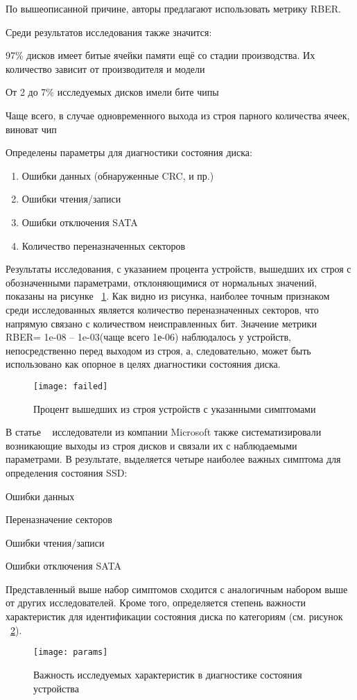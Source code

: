 По вышеописанной причине, авторы предлагают использовать метрику RBER. 


Среди результатов исследования также значится:
\begin{itemize*}
	\item{97\% дисков имеет битые ячейки памяти ещё со стадии производства. Их количество зависит от производителя и модели} 
    \item{От 2 до 7\% исследуемых дисков имели бите чипы}
    \item{Чаще всего, в случае одновременного выхода из строя парного количества ячеек, виноват чип} 
    \item{Определены параметры для диагностики состояния диска:}
	\begin{enumerate}
		\item{Ошибки данных (обнаруженные CRC, и пр.)}
		\item{Ошибки чтения/записи}
		\item{Ошибки отключения SATA}
		\item{Количество переназначенных секторов}
	\end{enumerate}
\end{itemize*}

Результаты исследования, с указанием процента устройств, вышедших их строя с обозначенными параметрами, отклоняющимися от нормальных значений, показаны на рисунке ~\ref{fig:failed}. Как видно из рисунка, наиболее точным признаком среди исследованных является количество переназначенных секторов, что напрямую связано с количеством неисправленных бит.
Значение метрики RBER= 1e-08 – 1e-03(чаще всего 1е-06) наблюдалось у устройств, непосредственно перед выходом из строя, а, следовательно, может быть использовано как опорное в целях диагностики состояния диска.

\begin{figure}[h]
	\centering
	\texttt{[image: failed]}
	\caption{Процент вышедших из строя устройств 
с указанными симптомами}
	\label{fig:failed}
\end{figure}

В статье ~\cite{faildatacenter} исследователи из компании Microsoft также систематизировали возникающие выходы из строя дисков и связали их с наблюдаемыми параметрами. 
В результате, выделяется четыре наиболее важных симптома для определения состояния SSD:
\begin{itemize*}
	\item{Ошибки данных}
    \item{Переназначение секторов}
    \item{Ошибки чтения/записи}
    \item{Ошибки отключения SATA}
\end{itemize*}
Представленный выше набор симптомов сходится с аналогичным набором выше от других исследователей. 
Кроме того, определяется степень важности характеристик для идентификации состояния диска по категориям (см. рисунок ~\ref{fig:params}). 
\begin{figure}[!h]
	\centering
	\texttt{[image: params]}
	\caption{Важность исследуемых характеристик в 
		диагностике состояния устройства}
	\label{fig:params}
\end{figure}

